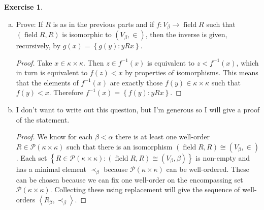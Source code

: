 \documentclass{article}
\theoremstyle{definition}
\newtheorem{question}{Exercise}
\newcommand{\set}[1]{\left\{#1\right\}}
\newcommand{\setwith}[2]{\set{#1\colon#2}}
\newcommand{\powset}{\mathcal{P}}
\DeclareMathOperator{\field}{field}
\begin{document}
\begin{question}
\begin{enumerate}[a., resume]
\begin{proof}
                  This means that there is an injective map
                  \(f:V_{\beta}\hookrightarrow\kappa\times\kappa\). Defining
                  \[
                      R=\setwith{(f(x),f(y))\in\kappa\times\kappa}{x,y\in V_{\beta},x<y}
                  \]
                  gives a relation \(R\) such that \((V_{\beta},<)\) and
                  \(\field R,R\) are clearly isomorphic because \(x<y\) exactly
                  iff \(f(x)<f(y)\) and \(f\) is bijective onto its range
                  because it is injective.
              \end{proof}

        \item Prove: If \(R\) is as in the previous parts and if
              \(f:V_{\beta}\to\field R\) such that \((\field R,R)\) is
              isomorphic to \((V_{\beta},\in)\), then the inverse is given,
              recursively, by \(g(x)=\setwith{g(y)}{yRx}\).

              \begin{proof}
                  Take \(x\in\kappa\times\kappa\). Then \(z\in f^{-1}(x)\) is
                  equivalent to \(z<f^{-1}(x)\), which in turn is equivalent to
                  \(f(z)<x\) by properties of isomorphisms. This means that the
                  elements of \(f^{-1}(x)\) are exactly those
                  \(f(y)\in\kappa\times\kappa\) such that \(f(y)<x\).
                  Therefore \(f^{-1}(x)=\setwith{f(y)}{yRx}\).
              \end{proof}

        \item I don't want to write out this question, but I'm generous so I
              will give a proof of the statement.

              \begin{proof}
                  We know for each \(\beta<\alpha\) there is at least one
                  well-order \(R\in\powset(\kappa\times\kappa)\) such that there
                  is an isomorphism \((\field R,R)\cong (V_{\beta},\in)\). Each
                  set \(\setwith{R\in\powset(\kappa\times\kappa)}{(\field
                      R,R)\cong(V_{\beta},\beta)}\) is non-empty and has a minimal
                  element \(\prec_{\beta}\) because
                  \(\powset(\kappa\times\kappa)\) can be well-ordered. These can
                  be chosen because we can fix one well-order on the
                  encompassing set \(\powset(\kappa\times\kappa)\). Collecting
                  these using replacement will give the sequence of well-orders
                  \(\left<R_{\beta},\prec_{\beta}\right>\).
              \end{proof}


\end{enumerate}
\end{question}
\end{document}
